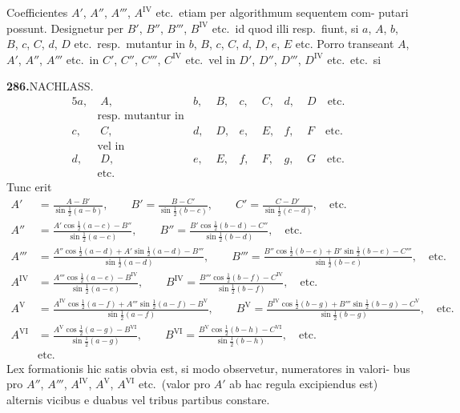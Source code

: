 \documentclass[12pt,a4paper]{article}
\begin{document}
\smallskip\noindent
Coefficientes $A'$, $A''$, $A'''$, $A^{\mathrm{IV}}$ etc.\ etiam per algorithmum sequentem com-
putari possunt. Designetur per $B'$, $B''$, $B'''$, $B^{\mathrm{IV}}$ etc.\ id quod illi resp.\ fiunt, si
$a$, $A$, $b$, $B$, $c$, $C$, $d$, $D$ etc.\ resp.\ mutantur in
$b$, $B$, $c$, $C$, $d$, $D$, $e$, $E$ etc.
Porro transeant
$A$, $A'$, $A''$, $A'''$ etc.\ in $C'$, $C''$, $C'''$, $C^{\mathrm{IV}}$ etc.\ vel in $D'$, $D''$, $D'''$, $D^{\mathrm{IV}}$ etc.\ etc.\ si

\newpage
\noindent\textbf{286.}\quad NACHLASS.
\begin{alignat*}{5}
a, &\; A, & b, &\; B, & c, &\; C, & d, &\; D \quad \text{etc.}\\
&\text{resp.\ mutantur in}\\
c, &\; C, & d, &\; D, & e, &\; E, & f, &\; F \quad \text{etc.}\\
&\text{vel in}\\
d, &\; D, & e, &\; E, & f, &\; F, & g, &\; G \quad \text{etc.}\\
&\text{etc.}
\end{alignat*}
Tunc erit
\begin{align*}
A' &= \frac{A-B'}{\sin\tfrac{1}{2}(a-b)}, \qquad
B' = \frac{B-C'}{\sin\tfrac{1}{2}(b-c)}, \qquad
C' = \frac{C-D'}{\sin\tfrac{1}{2}(c-d)}, \quad \text{etc.}\\
A'' &= \frac{A'\cos\tfrac{1}{2}(a-c)-B''}{\sin\tfrac{1}{2}(a-c)}, \qquad
B'' = \frac{B'\cos\tfrac{1}{2}(b-d)-C''}{\sin\tfrac{1}{2}(b-d)}, \quad \text{etc.}\\
A''' &= \frac{A''\cos\tfrac{1}{2}(a-d)+A'\sin\tfrac{1}{2}(a-d)-B'''}{\sin\tfrac{1}{2}(a-d)}, \qquad
B''' = \frac{B''\cos\tfrac{1}{2}(b-e)+B'\sin\tfrac{1}{2}(b-e)-C'''}{\sin\tfrac{1}{2}(b-e)}, \quad \text{etc.}\\
A^{\mathrm{IV}} &= \frac{A'''\cos\tfrac{1}{2}(a-e)-B^{\mathrm{IV}}}{\sin\tfrac{1}{2}(a-e)}, \qquad
B^{\mathrm{IV}} = \frac{B'''\cos\tfrac{1}{2}(b-f)-C^{\mathrm{IV}}}{\sin\tfrac{1}{2}(b-f)}, \quad \text{etc.}\\
A^{\mathrm{V}} &= \frac{A^{\mathrm{IV}}\cos\tfrac{1}{2}(a-f)+A'''\sin\tfrac{1}{2}(a-f)-B^{\mathrm{V}}}{\sin\tfrac{1}{2}(a-f)}, \qquad
B^{\mathrm{V}} = \frac{B^{\mathrm{IV}}\cos\tfrac{1}{2}(b-g)+B'''\sin\tfrac{1}{2}(b-g)-C^{\mathrm{V}}}{\sin\tfrac{1}{2}(b-g)}, \quad \text{etc.}\\
A^{\mathrm{VI}} &= \frac{A^{\mathrm{V}}\cos\tfrac{1}{2}(a-g)-B^{\mathrm{VI}}}{\sin\tfrac{1}{2}(a-g)}, \qquad
B^{\mathrm{VI}} = \frac{B^{\mathrm{V}}\cos\tfrac{1}{2}(b-h)-C^{\mathrm{VI}}}{\sin\tfrac{1}{2}(b-h)}, \quad \text{etc.}\\
&\text{etc.}
\end{align*}
Lex formationis hic satis obvia est, si modo observetur, numeratores in valori-
bus pro $A''$, $A'''$, $A^{\mathrm{IV}}$, $A^{\mathrm{V}}$, $A^{\mathrm{VI}}$ etc.\ (valor pro $A'$ ab hac regula excipiendus est)
alternis vicibus e duabus vel tribus partibus constare.
\end{document}
